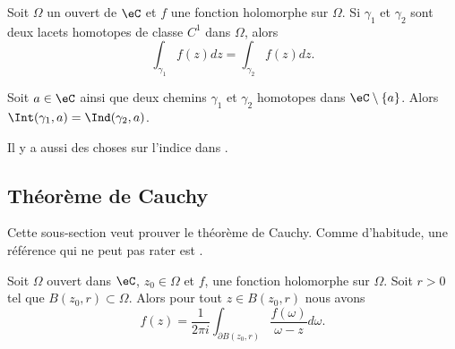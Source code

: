 \begin{theorem}
    Soit \( \Omega\) un ouvert de \( \eC\) et \( f\) une fonction holomorphe sur \( \Omega\). Si \( \gamma_1\) et \( \gamma_2\) sont deux lacets homotopes de classe \( C^1\) dans \( \Omega\), alors
    \begin{equation}
        \int_{\gamma_1}f(z)dz=\int_{\gamma_2}f(z)dz.
    \end{equation}
\end{theorem}

\begin{corollary}   \label{CorGZXzuZR}
    Soit \( a\in \eC\) ainsi que deux chemins \( \gamma_1\) et \( \gamma_2\) homotopes dans \( \eC\setminus\{ a \}\). Alors \( \Int(\gamma_1,a)=\Ind(\gamma_2,a)\).
\end{corollary}
Il y a aussi des choses sur l'indice dans \cite{Holomorphieus}.


\subsection{Théorème de Cauchy}

Cette sous-section veut prouver le théorème de Cauchy. Comme d'habitude, une référence qui ne peut pas rater est \cite{Holomorphieus}.


\begin{theorem}    \label{ThoUHztQe}
    Soit \( \Omega\) ouvert dans \( \eC\), \( z_0\in \Omega\) et \( f\), une fonction holomorphe sur \( \Omega\). Soit \( r>0\) tel que \( B(z_0,r)\subset \Omega\). Alors pour tout \( z\in B(z_0,r)\) nous avons
    \begin{equation}    \label{EqPzUABM}
        f(z)=\frac{1}{ 2\pi i }\int_{\partial B(z_0,r)}\frac{ f(\omega) }{ \omega-z }d\omega.
    \end{equation}
\end{theorem}

